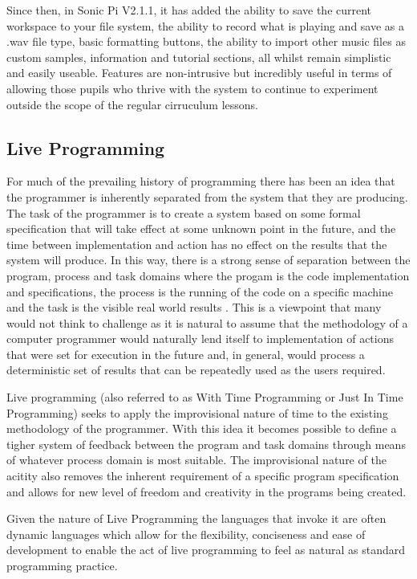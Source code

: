 \documentclass[11pt]{scrartcl}
\begin{document}
Since then, in Sonic Pi V2.1.1, it has added the ability to save the current 
workspace to your file system, the ability to record what is playing and save 
as a .wav file type, basic formatting buttons, the ability to import other 
music files as custom samples, information and tutorial sections, all whilst 
remain simplistic and easily useable. Features are non-intrusive but 
incredibly useful in terms of allowing those pupils who thrive with the system 
to continue to experiment outside the scope of the regular cirruculum lessons.

\subsection{Live Programming}
For much of the prevailing history of programming there has been an idea that 
the programmer is inherently separated from the system that they are 
producing. The task of the programmer is to create a system based on some 
formal specification that will take effect at some unknown point in the 
future, and the time between implementation and action has no effect on the 
results that the system will produce. In this way, there is a strong sense of 
separation between the program, process and task domains where the progam is 
the code implementation and specifications, the process is the running of the 
code on a specific machine and the task is the visible real world results
\cite{SG10}. This is a viewpoint that many would not think to challenge as it 
is natural to assume that the methodology of a computer programmer would 
naturally lend itself to implementation of actions that were set for execution 
in the future and, in general, would process a deterministic set of results 
that can be repeatedly used as the users required.

Live programming (also referred to as With Time Programming or Just In Time 
Programming) seeks to apply the improvisional nature of time to the existing 
methodology of the programmer. With this idea it becomes possible to define a 
tigher system of feedback between the program and task domains through means 
of whatever process domain is most suitable. The improvisional nature of the 
acitity also removes the inherent requirement of a specific program 
specification and allows for new level of freedom and creativity in the 
programs being created. 

Given the nature of Live Programming the languages that invoke it are often 
dynamic languages which allow for the flexibility, conciseness and ease of 
development \cite{McD07} to enable the act of live programming to feel as 
natural as standard programming practice.
\end{document}
